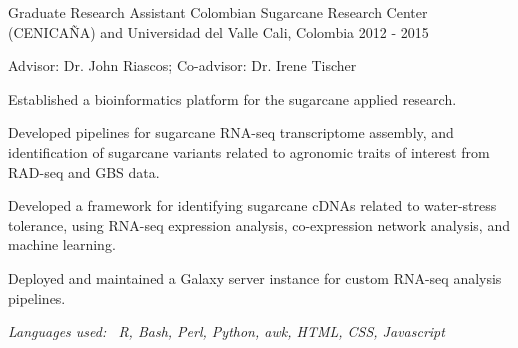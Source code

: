 \begin{cventries}
\vspace{\acvSectionContentTopSkip}
\cventry
{Graduate Research Assistant} %
{Colombian Sugarcane Research Center (CENICAÑA) and Universidad del Valle} %
{Cali, Colombia} %
{2012 - 2015} %
{ %
Advisor: Dr. John Riascos; Co-advisor: Dr. Irene Tischer\newline
\vspace{2.0mm}
\textit{}
\vspace{\acvDescAfterDutiesSkip}
\begin{cvitems}
    \item {Established a bioinformatics platform for the sugarcane applied research.}
    \item {Developed pipelines for sugarcane RNA-seq transcriptome assembly, and identification of sugarcane variants related to agronomic traits of interest from RAD-seq and GBS data.}
\end{cvitems}
\vspace{6.0mm}
\textit{}
\vspace{\acvDescAfterDutiesSkip}
\begin{cvitems}
    \item {Developed a framework for identifying sugarcane cDNAs related to water-stress tolerance, using RNA-seq expression analysis, co-expression network analysis, and machine learning.}
    \item{Deployed and maintained a Galaxy server instance for custom RNA-seq analysis pipelines.}
\end{cvitems}
\vspace{\acvDescAfterDutiesSkip}
\textit{Languages used:~ R, Bash, Perl, Python, awk, HTML, CSS, Javascript}
}
\end{cventries}


